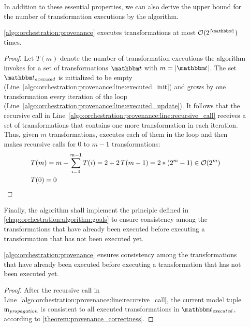 In addition to these essential properties, we can also derive the upper bound for the number of transformation executions by the algorithm.

\begin{theorem}
    \autoref{algo:orchestration:provenance} executes transformations at most $\mathcal{O}(2^{\abs{\transformationset{T}}})$ times.
\end{theorem}
\begin{proof}
	Let $T(m)$ denote the number of transformation executions the algorithm invokes for a set of transformations $\transformationset{T}$ with $m = \abs{\transformationset{T}}$.
	The set $\provalgexecuted$ is initialized to be empty (Line~\ref{algo:orchestration:provenance:line:executed_init}) and grows by one transformation every iteration of the loop (Line~\ref{algo:orchestration:provenance:line:executed_update}).
    It follows that the recursive call in Line~\ref{algo:orchestration:provenance:line:recursive_call} receives a set of transformations that contains one more transformation in each iteration.
    Thus, given $m$ transformations,  executes each of them in the loop and then makes recursive calls for $0$ to $m-1$ transformations:
    \begin{align*}
        &
    T(m)	=m+\sum_{i=0}^{m-1}T(i)
    	=2+2\,T(m-1)
        =2*(2^{m}-1) \in \mathcal{O}(2^m) \\
        &
    T(0)	=0 \qedhere
	\end{align*}
\end{proof}

Finally, the algorithm shall implement the principle defined in \autoref{chap:orchestration:algorithm:goals} to ensure consistency among the transformations that have already been executed before executing a transformation that has not been executed yet.

\begin{theorem}
    \autoref{algo:orchestration:provenance} ensures consistency among the transformations that have already been executed before executing a transformation that has not been executed yet.
\end{theorem}
\begin{proof}
	After the recursive call in Line~\ref{algo:orchestration:provenance:line:recursive_call}, the current model tuple $\modeltuple{m}_{\mathvariable{propagation}}$ is consistent to all executed transformations in $\provalgexecuted$, according to \autoref{theorem:provenance_correctness}. %
\end{proof}	

